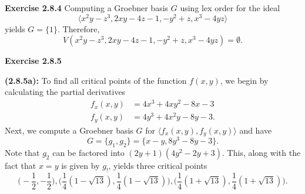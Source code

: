 \documentclass[12pt,oneside]{article}
\newenvironment{exercise}[1]{\vspace{.1in}\noindent\textbf{Exercise #1 \hspace{.05em}}}{}
\begin{document}

\newpage
\begin{exercise}{2.8.4}
    Computing a Groebner basis $G$ using lex order for the ideal 
    \[
        \langle x^2y-z^3,2xy-4z-1,-y^2+z,x^3-4yz\rangle
    \]
    yields $G=\{1\}$. Therefore, 
    \[
        V(x^2y-z^3,2xy-4z-1,-y^2+z,x^3-4yz) = \emptyset.
    \]
\end{exercise}


\begin{exercise}{2.8.5}

    \bigskip
    \textbf{(2.8.5a):}
    To find all critical points of the function $f(x,y)$, we begin by calculating the 
    partial derivatives 
    \begin{align*}
        f_x(x,y) &= 4x^3+4xy^2-8x-3\\
        f_y(x,y) &= 4y^3+4x^2y-8y-3.
    \end{align*}
    Next, we compute a Groebner basis $G$ for $\langle f_x(x,y), f_y(x,y)\rangle$ and have 
    \[
        G=\{g_1,g_2\}=\{x-y,8y^3-8y-3\}.
    \]
    Note that $g_2$ can be factored into $(2y+1)(4y^2-2y+3)$. This, along with the 
    fact that $x=y$ is given by $g_!$, yields three critical points 
    \[
        \biggr(-\frac{1}{2},-\frac{1}{2}\biggr),\biggr(\frac{1}{4}(1-\sqrt{13}),\frac{1}{4}(1-\sqrt{13})\biggr),\biggr(\frac{1}{4}(1+\sqrt{13}),\frac{1}{4}(1+\sqrt{13})\biggr).
    \]
    

\end{exercise}
\end{document}
